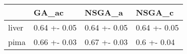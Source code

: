 \begin{tabular}{llll}
\toprule
{} &         GA\_ac &        NSGA\_a &        NSGA\_c \\
\midrule
liver &  0.64 +- 0.05 &  0.64 +- 0.05 &  0.64 +- 0.05 \\
pima  &  0.66 +- 0.03 &  0.67 +- 0.03 &   0.6 +- 0.04 \\
\bottomrule
\end{tabular}

